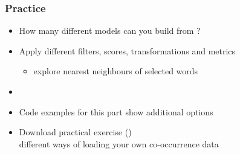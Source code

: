 \documentclass[t]{beamer} %
\begin{document}
\begin{frame}
  \frametitle{Practice}
  \begin{itemize}
  \item How many different models can you build from ?
  \item Apply different filters, scores, transformations and metrics
    \begin{itemize}
    \item[\hand] explore nearest neighbours of selected words
    \end{itemize}
  \item[]
  \item Code examples for this part show additional options
  \item Download practical exercise ()\\
    \so different ways of loading your own co-occurrence data
  \end{itemize}
\end{frame}



\end{document}
